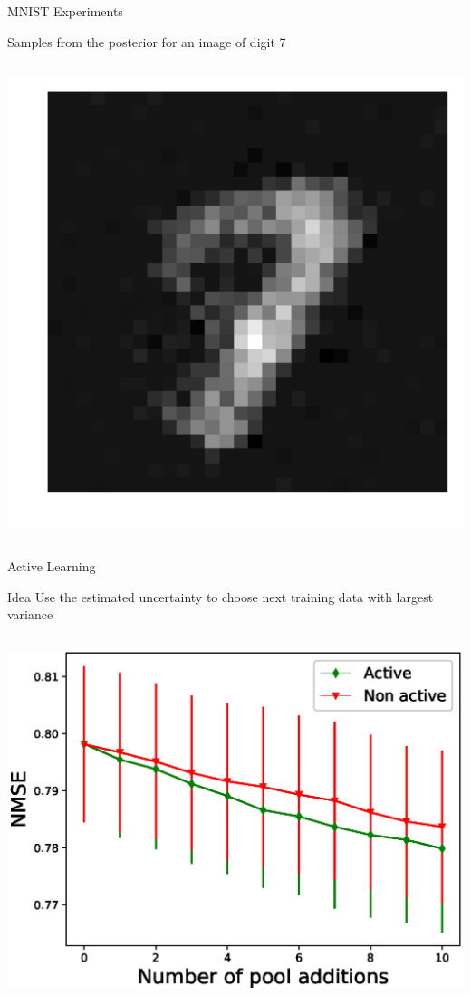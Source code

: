 \documentclass[9pt]{beamer}
\begin{document}
\begin{frame}{MNIST Experiments}
\begin{block}{Samples from the posterior for an image of digit 7}
\begin{columns}
\begin{column}{0.33\textwidth}
        \includegraphics[width=0.75\columnwidth]{graphics/posterior_sample_2}
      \end{column}
    \end{columns}
  \end{block}
\end{frame}

\begin{frame}{Active Learning}
  \centering
  \begin{block}{Idea}
    Use the estimated uncertainty to choose next training data with largest variance
  \end{block}
  \begin{columns}
    \begin{column}{0.5\textwidth}
      \includegraphics[width=1.0\columnwidth]{graphics/active_mnist/nmse_validation}
    \end{column}
  \end{columns}

\end{frame}
\end{document}
